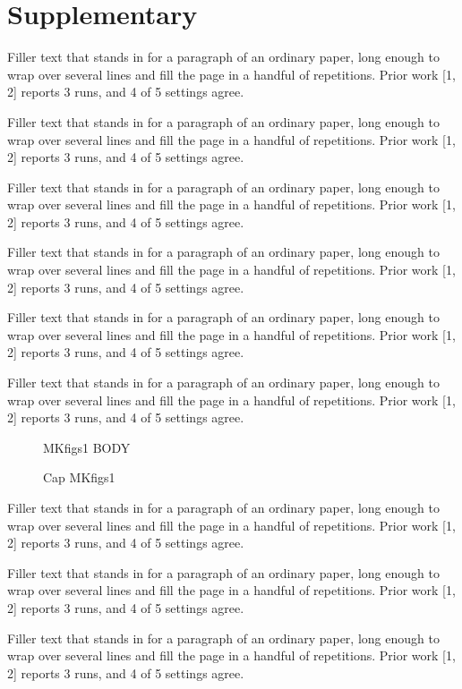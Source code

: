 \documentclass{article}
\begin{document}
\clearpage\setcounter{page}{1}\section*{Supplementary}
Filler text that stands in for a paragraph of an ordinary paper, long enough to wrap over several lines and fill the page in a handful of repetitions. Prior work [1, 2] reports 3 runs, and 4 of 5 settings agree.\par
Filler text that stands in for a paragraph of an ordinary paper, long enough to wrap over several lines and fill the page in a handful of repetitions. Prior work [1, 2] reports 3 runs, and 4 of 5 settings agree.\par
Filler text that stands in for a paragraph of an ordinary paper, long enough to wrap over several lines and fill the page in a handful of repetitions. Prior work [1, 2] reports 3 runs, and 4 of 5 settings agree.\par
Filler text that stands in for a paragraph of an ordinary paper, long enough to wrap over several lines and fill the page in a handful of repetitions. Prior work [1, 2] reports 3 runs, and 4 of 5 settings agree.\par
Filler text that stands in for a paragraph of an ordinary paper, long enough to wrap over several lines and fill the page in a handful of repetitions. Prior work [1, 2] reports 3 runs, and 4 of 5 settings agree.\par
Filler text that stands in for a paragraph of an ordinary paper, long enough to wrap over several lines and fill the page in a handful of repetitions. Prior work [1, 2] reports 3 runs, and 4 of 5 settings agree.\par
\begin{figure}[t]\centering MKfigs1 BODY\caption{Cap MKfigs1}\label{fig:s1}\end{figure}
Filler text that stands in for a paragraph of an ordinary paper, long enough to wrap over several lines and fill the page in a handful of repetitions. Prior work [1, 2] reports 3 runs, and 4 of 5 settings agree.\par
Filler text that stands in for a paragraph of an ordinary paper, long enough to wrap over several lines and fill the page in a handful of repetitions. Prior work [1, 2] reports 3 runs, and 4 of 5 settings agree.\par
Filler text that stands in for a paragraph of an ordinary paper, long enough to wrap over several lines and fill the page in a handful of repetitions. Prior work [1, 2] reports 3 runs, and 4 of 5 settings agree.\par
\end{document}
